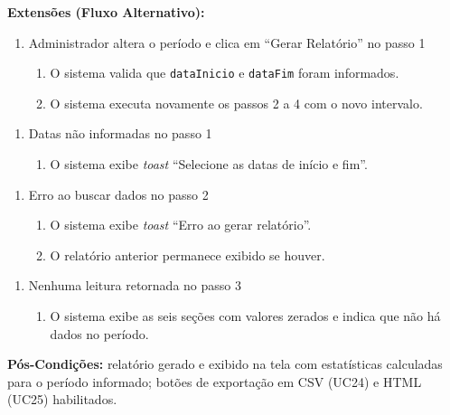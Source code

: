 \textbf{Extensões (Fluxo Alternativo):}

\begin{enumerate}
  \renewcommand{\theenumi}{1a}
  \renewcommand{\labelenumi}{\theenumi.}
  \item Administrador altera o período e clica em
        ``Gerar Relatório'' no passo 1
  \begin{enumerate}
  \item O sistema valida que \texttt{dataInicio} e
        \texttt{dataFim} foram informados.
  \item O sistema executa novamente os passos 2 a 4
        com o novo intervalo.
  \end{enumerate}
\end{enumerate}

\begin{enumerate}
  \renewcommand{\theenumi}{1b}
  \renewcommand{\labelenumi}{\theenumi.}
  \item Datas não informadas no passo 1
  \begin{enumerate}
  \item O sistema exibe \textit{toast}
        ``Selecione as datas de início e fim''.
  \end{enumerate}
\end{enumerate}

\begin{enumerate}
  \renewcommand{\theenumi}{2a}
  \renewcommand{\labelenumi}{\theenumi.}
  \item Erro ao buscar dados no passo 2
  \begin{enumerate}
  \item O sistema exibe \textit{toast}
        ``Erro ao gerar relatório''.
  \item O relatório anterior permanece exibido se
        houver.
  \end{enumerate}
\end{enumerate}

\begin{enumerate}
  \renewcommand{\theenumi}{3a}
  \renewcommand{\labelenumi}{\theenumi.}
  \item Nenhuma leitura retornada no passo 3
  \begin{enumerate}
  \item O sistema exibe as seis seções com valores
        zerados e indica que não há dados no período.
  \end{enumerate}
\end{enumerate}

\textbf{Pós-Condições:} relatório gerado e exibido na
tela com estatísticas calculadas para o período
informado; botões de exportação em CSV (UC24) e HTML
(UC25) habilitados.

